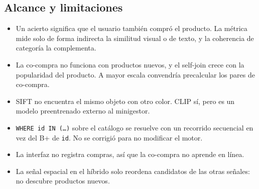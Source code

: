 \subsection{Alcance y limitaciones}
\begin{itemize}
  \item Un acierto significa que el usuario también compró el producto. La métrica mide solo de forma indirecta la similitud visual o de texto, y la coherencia de categoría la complementa.
  \item La co-compra no funciona con productos nuevos, y el self-join crece con la popularidad del producto. A mayor escala convendría precalcular los pares de co-compra.
  \item SIFT no encuentra el mismo objeto con otro color. CLIP sí, pero es un modelo preentrenado externo al minigestor.
  \item \texttt{WHERE id IN (\ldots)} sobre el catálogo se resuelve con un recorrido secuencial en vez del B+ de \texttt{id}. No se corrigió para no modificar el motor.
  \item La interfaz no registra compras, así que la co-compra no aprende en línea.
  \item La señal espacial en el híbrido solo reordena candidatos de las otras señales: no descubre productos nuevos.
\end{itemize}

%

